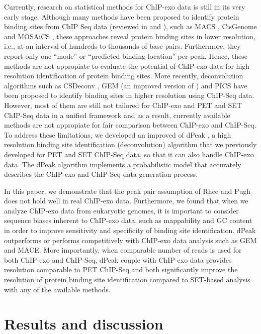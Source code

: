 \documentclass{bmcart}\usepackage[]{graphicx}\usepackage[]{color}
\begin{document}
Currently, research on statistical methods for ChIP-exo data is still
in its very early stage. Although many methods have been proposed to
identify protein binding sites from ChIP Seq data (reviewed in
\cite{evaluation} and \cite{computation}), such as MACS \cite{macs},
CisGenome \cite{cisgenome} and MOSAiCS \cite{mosaics}, these
approaches reveal protein binding sites in lower resolution, i.e., at
an interval of hundreds to thousands of base pairs. Furthermore, they
report only one ``mode'' or ``predicted binding location'' per
peak. Hence, these methods are not appropiate to evaluate the
potential of ChIP-exo data for high resolution identification of
protein binding sites. More recently, deconvolution algorithms such as
CSDeconv \cite{csdeconv}, GEM \cite{gem} (an improved version of
\cite{gps}) and PICS \cite{pics} have been proposed to identify
binding sites in higher resolution using ChIP-Seq data. However, most
of them are still not tailored for ChIP-exo and PET and SET ChIP-Seq
data in a unified framework and as a result, currently available
methods are not appropiate for fair comparison between ChIP-exo and
ChIP-Seq. To address these limitations, we developed an improved of
dPeak \cite{dpeak}, a high resolution binding site identification
(deconvolution) algorithm that we previously developed for PET and SET
ChIP-Seq data, so that it can also handle ChIP-exo data. The dPeak
algorithm implements a probabilistic model that accurately describes
the ChIP-exo and ChIP-Seq data generation process.

In this paper, we demonstrate that the peak pair assumption of Rhee
and Pugh \cite{exo1} does not hold well in real ChIP-exo
data. Furthermore, we found that when we analyze ChIP-exo data from
eukaryotic genomes, it is important to consider sequence biases
inherent to ChIP-exo data, such as mappability and GC content in order
to improve sensitivity and specificity of binding site
identification. dPeak outperforms or performs competitively with
ChIP-exo data analysis such as GEM and MACE. More importantly, when
comparable number of reads is used for both ChIP-exo and ChIP-Seq,
dPeak couple with ChIP-exo data provides resolution comparable to PET
ChIP-Seq and both significantly improve the resolution of protein
binding site identification compared to SET-based analysis with any of
the available methods.

\section{Results and discussion}
\label{sec:results}
\end{document}
